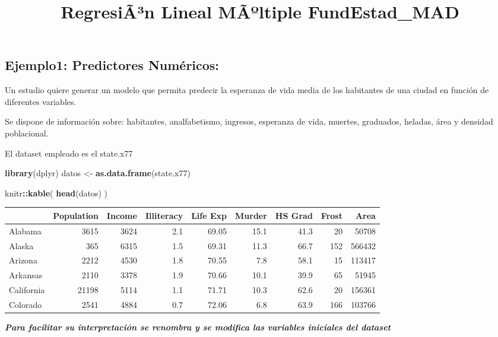 \documentclass[]{article}
\title{RegresiÃ³n Lineal MÃºltiple FundEstad\_MAD}
\author{}
\date{\vspace{-2.5em}}
\newenvironment{Shaded}{\begin{snugshade}}{\end{snugshade}}
\newcommand{\KeywordTok}[1]{\textcolor[rgb]{0.13,0.29,0.53}{\textbf{#1}}}
\newcommand{\StringTok}[1]{\textcolor[rgb]{0.31,0.60,0.02}{#1}}
\newcommand{\OperatorTok}[1]{\textcolor[rgb]{0.81,0.36,0.00}{\textbf{#1}}}
\newcommand{\NormalTok}[1]{#1}
\begin{document}
\maketitle

\subsection{Ejemplo1: Predictores
Numéricos:}\label{ejemplo1-predictores-numuxe9ricos}

Un estudio quiere generar un modelo que permita predecir la esperanza de
vida media de los habitantes de una ciudad en función de diferentes
variables.

Se dispone de información sobre: habitantes, analfabetismo, ingresos,
esperanza de vida, muertes, graduados, heladas, área y densidad
poblacional.

El dataset empleado es el state.x77

\begin{Shaded}
\begin{Highlighting}[]
\KeywordTok{library}\NormalTok{(dplyr)}
\NormalTok{datos <-}\StringTok{ }\KeywordTok{as.data.frame}\NormalTok{(state.x77)}

\NormalTok{knitr}\OperatorTok{::}\KeywordTok{kable}\NormalTok{(}
\KeywordTok{head}\NormalTok{(datos)}
\NormalTok{)}
\end{Highlighting}
\end{Shaded}

\begin{longtable}[]{@{}lrrrrrrrr@{}}
\toprule
& Population & Income & Illiteracy & Life Exp & Murder & HS Grad & Frost
& Area\tabularnewline
\midrule
\endhead
Alabama & 3615 & 3624 & 2.1 & 69.05 & 15.1 & 41.3 & 20 &
50708\tabularnewline
Alaska & 365 & 6315 & 1.5 & 69.31 & 11.3 & 66.7 & 152 &
566432\tabularnewline
Arizona & 2212 & 4530 & 1.8 & 70.55 & 7.8 & 58.1 & 15 &
113417\tabularnewline
Arkansas & 2110 & 3378 & 1.9 & 70.66 & 10.1 & 39.9 & 65 &
51945\tabularnewline
California & 21198 & 5114 & 1.1 & 71.71 & 10.3 & 62.6 & 20 &
156361\tabularnewline
Colorado & 2541 & 4884 & 0.7 & 72.06 & 6.8 & 63.9 & 166 &
103766\tabularnewline
\bottomrule
\end{longtable}

\emph{\textbf{Para facilitar su interpretación se renombra y se modifica
las variables iniciales del dataset}}
\end{document}
